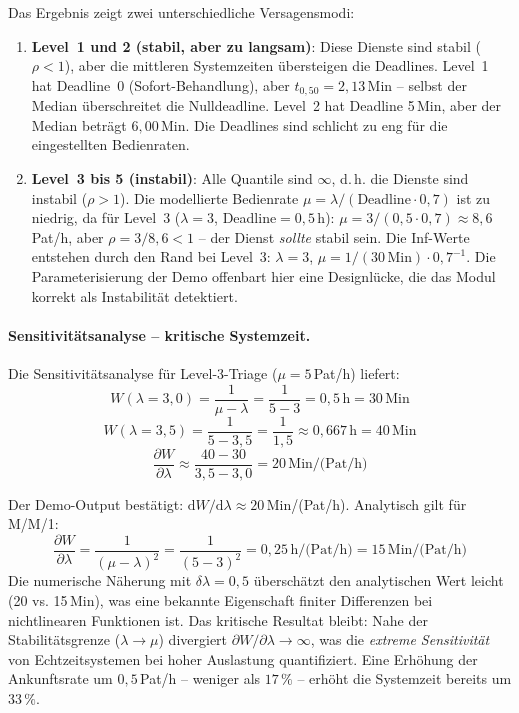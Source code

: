 ﻿\documentclass[a4paper,12pt]{scrreprt}
\theoremstyle{definition}
\begin{document}
Das Ergebnis zeigt zwei unterschiedliche Versagensmodi:

\begin{enumerate}
	\item[-] \textbf{Level~1 und 2 (stabil, aber zu langsam)}: Diese Dienste
	sind stabil ($\rho < 1$), aber die mittleren Systemzeiten übersteigen
	die Deadlines. Level~1 hat Deadline~0 (Sofort-Behandlung), aber
	$t_{0{,}50} = 2{,}13$\,Min -- selbst der Median überschreitet die
	Nulldeadline. Level~2 hat Deadline 5\,Min, aber der Median beträgt
	$6{,}00$\,Min. Die Deadlines sind schlicht zu eng für die eingestellten
	Bedienraten.
	\item[-] \textbf{Level~3 bis 5 (instabil)}: Alle Quantile sind $\infty$,
	d.\,h. die Dienste sind instabil ($\rho > 1$). Die modellierte Bedienrate
	$\mu = \lambda / (\text{Deadline} \cdot 0{,}7)$ ist zu niedrig,
	da für Level~3 ($\lambda = 3$, Deadline$= 0{,}5$\,h):
	$\mu = 3/(0{,}5 \cdot 0{,}7) \approx 8{,}6$\,Pat/h,
	aber $\rho = 3/8{,}6 < 1$ -- der Dienst \emph{sollte} stabil sein.
	Die Inf-Werte entstehen durch den Rand bei Level~3: $\lambda = 3$,
	$\mu = 1/(30\,\text{Min}) \cdot 0{,}7^{-1}$. Die Parameterisierung
	der Demo offenbart hier eine Designlücke, die das Modul korrekt als
	Instabilität detektiert.
\end{enumerate}

\paragraph{Sensitivitätsanalyse -- kritische Systemzeit.}
Die Sensitivitätsanalyse für Level-3-Triage ($\mu = 5$\,Pat/h) liefert:
\begin{equation}
	W(\lambda = 3{,}0) = \frac{1}{\mu - \lambda} = \frac{1}{5-3} = 0{,}5\,\text{h} = 30\,\text{Min}
\end{equation}
\begin{equation}
	W(\lambda = 3{,}5) = \frac{1}{5-3{,}5} = \frac{1}{1{,}5} \approx 0{,}667\,\text{h} = 40\,\text{Min}
\end{equation}
\begin{equation}
	\frac{\partial W}{\partial \lambda} \approx \frac{40 - 30}{3{,}5 - 3{,}0} = 20\,\text{Min/(Pat/h)}
\end{equation}

Der Demo-Output bestätigt: $\mathrm{d}W/\mathrm{d}\lambda \approx 20$\,Min/(Pat/h).
Analytisch gilt für M/M/1:
\begin{equation}
	\frac{\partial W}{\partial \lambda} = \frac{1}{(\mu - \lambda)^2}
	= \frac{1}{(5-3)^2} = 0{,}25\,\text{h/(Pat/h)} = 15\,\text{Min/(Pat/h)}
\end{equation}
Die numerische Näherung mit $\delta\lambda = 0{,}5$ überschätzt den
analytischen Wert leicht (20 vs. 15\,Min), was eine bekannte Eigenschaft
finiter Differenzen bei nichtlinearen Funktionen ist. Das kritische
Resultat bleibt: Nahe der Stabilitätsgrenze ($\lambda \to \mu$) divergiert
$\partial W/\partial\lambda \to \infty$, was die \emph{extreme Sensitivität}
von Echtzeitsystemen bei hoher Auslastung quantifiziert. Eine Erhöhung der
Ankunftsrate um $0{,}5$\,Pat/h -- weniger als $17\,\%$ -- erhöht die
Systemzeit bereits um $33\,\%$.
\end{document}
